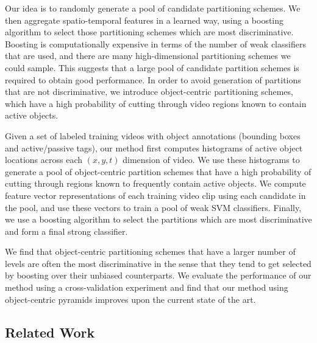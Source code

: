 \documentclass{bmvc2k}
\begin{document}
  Our idea is to randomly generate a pool
  of candidate partitioning schemes. 
  We then aggregate spatio-temporal features in a
  learned way, using a boosting algorithm to select those partitioning schemes which are most discriminative.
  Boosting is computationally expensive in terms of the number of weak
  classifiers that are used, and there are many high-dimensional
  partitioning schemes we could sample. This suggests that a large pool of
  candidate partition schemes is required to obtain good performance.
  In order to avoid generation of partitions that are not discriminative, we
  introduce object-centric partitioning schemes, which have a high
  probability of cutting through video regions known to contain active
  objects.
  





  Given a set of labeled training videos with object annotations (bounding boxes and
  active/passive tags), our method first computes histograms of active
  object locations across each $(x,y,t)$ dimension of video. We use these
  histograms to generate a pool of object-centric partition schemes that have a high
  probability of cutting through regions known to frequently contain active
  objects. We compute feature vector representations of each training video clip using each
  candidate in the pool, and use these vectors to train a pool of weak SVM
  classifiers. Finally, we use a boosting algorithm to select the partitions
  which are most discriminative and form a final strong classifier.






  We find that object-centric partitioning schemes that have a larger number
  of levels are often the most discriminative in the sense that they tend to
  get selected by boosting over their unbiased counterparts.
  We evaluate the performance of our method using a cross-validation
  experiment and find that our method using object-centric pyramids improves
  upon the current state of the art.





	

\subsection{Related Work}
\end{document}
